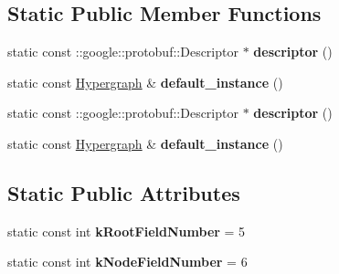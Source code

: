 \subsection*{Static Public Member Functions}
\begin{DoxyCompactItemize}
\item 
\hypertarget{classHypergraph_ab26f2bbcbb6ce99b3bbb1a210cdfcd38}{
static const ::google::protobuf::Descriptor $\ast$ {\bfseries descriptor} ()}
\label{classHypergraph_ab26f2bbcbb6ce99b3bbb1a210cdfcd38}

\item 
\hypertarget{classHypergraph_ad44f1245d88fb5a3c542f7c1d7081390}{
static const \hyperlink{classHypergraph}{Hypergraph} \& {\bfseries default\_\-instance} ()}
\label{classHypergraph_ad44f1245d88fb5a3c542f7c1d7081390}

\item 
\hypertarget{classHypergraph_ab26f2bbcbb6ce99b3bbb1a210cdfcd38}{
static const ::google::protobuf::Descriptor $\ast$ {\bfseries descriptor} ()}
\label{classHypergraph_ab26f2bbcbb6ce99b3bbb1a210cdfcd38}

\item 
\hypertarget{classHypergraph_ad44f1245d88fb5a3c542f7c1d7081390}{
static const \hyperlink{classHypergraph}{Hypergraph} \& {\bfseries default\_\-instance} ()}
\label{classHypergraph_ad44f1245d88fb5a3c542f7c1d7081390}

\end{DoxyCompactItemize}
\subsection*{Static Public Attributes}
\begin{DoxyCompactItemize}
\item 
\hypertarget{classHypergraph_a2e8f834b9b2c946dc1c7bdaded177a2b}{
static const int {\bfseries kRootFieldNumber} = 5}
\label{classHypergraph_a2e8f834b9b2c946dc1c7bdaded177a2b}

\item 
\hypertarget{classHypergraph_a2d9dea1733d42814b38878cd7e93195f}{
static const int {\bfseries kNodeFieldNumber} = 6}
\label{classHypergraph_a2d9dea1733d42814b38878cd7e93195f}

\end{DoxyCompactItemize}
